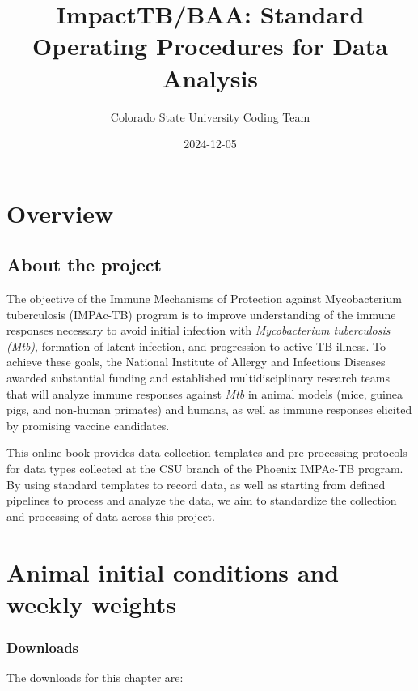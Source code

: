 \documentclass[
]{book}
\title{ImpactTB/BAA: Standard Operating Procedures for Data Analysis}
\author{Colorado State University Coding Team}
\date{2024-12-05}
\begin{document}
\maketitle

{
\setcounter{tocdepth}{1}
\tableofcontents
}
\chapter{Overview}\label{overview}

\section{About the project}\label{about-the-project}

The objective of the Immune Mechanisms of Protection against Mycobacterium tuberculosis (IMPAc-TB) program is to
improve understanding of the immune responses necessary to avoid initial infection with \emph{Mycobacterium tuberculosis (Mtb)}, formation of latent infection, and progression to active TB illness. To achieve these goals, the National Institute of Allergy and Infectious Diseases awarded substantial funding and established multidisciplinary research teams that will analyze immune responses against \emph{Mtb} in animal models (mice, guinea pigs, and non-human primates) and humans, as well as immune responses elicited by promising vaccine candidates.

This online book provides data collection templates and pre-processing protocols
for data types collected at the CSU branch of the Phoenix IMPAc-TB program.
By using
standard templates to record data, as well as starting from defined pipelines to
process and analyze the data, we aim to standardize the collection and processing
of data across this project.

\chapter{Animal initial conditions and weekly weights}\label{animal-initial-conditions-and-weekly-weights}

\subsection{Downloads}\label{downloads}

The downloads for this chapter are:
\end{document}
